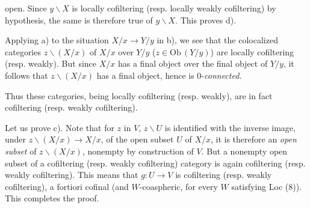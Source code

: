 \documentclass[11pt]{article}
\newcommand{\printedpage}[1]{\marginpar{\footnotesize p.~#1}}
\newcommand{\msp}[1]{\marginpar{\footnotesize [#1]}}
\newcommand{\margmark}[1]{\marginpar{\footnotesize #1}}
\newcommand{\Ob}{\mathrm{Ob}}
\begin{document}
\printedpage{59}

open. Since $y\backslash X$ is locally cofiltering (resp. locally weakly cofiltering) by hypothesis, the same is therefore true of $y\backslash X$. This proves d).

Applying a) to the situation $X/x \longrightarrow Y/y$ in b), we see that the colocalized categories $z\backslash(X/x)$ of
\margmark{!} %
$X/x$ over $Y/y$ ($z \in \Ob\,(Y/y)$) are locally cofiltering (resp. weakly). But since $X/x$ has a final object over the final object of $Y/y$, it follows that $z\backslash(X/x)$ has a final object, hence is $0$-\textit{connected.}

\msp{page 95}
Thus these categories, being locally cofiltering (resp. weakly), are in fact cofiltering (resp. weakly cofiltering).

Let us prove c). Note that for $z$ in $V$, $z\backslash U$ is identified with the inverse image, under $z\backslash(X/x) \longrightarrow X/x$, of the open subset $U$ of $X/x$, it is therefore an \textit{open subset} of $z\backslash(X/x)$, nonempty by construction of $V$. But a nonempty open subset of a cofiltering (resp. weakly cofiltering) category is again cofiltering (resp. weakly cofiltering). This means that $g : U \longrightarrow V$ is cofiltering (resp. weakly cofiltering), a fortiori cofinal (and $W$-coaspheric, for every $W$ satisfying Loc (8)). This completes the proof.
\end{document}
